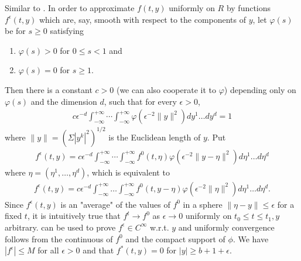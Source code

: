 \documentclass{article}
\begin{document}
Similar to \cite[P139 Lemma 4.1.1]{mtnotes}. In order to approximate $f(t, y)$ uniformly on $R$ by functions $f^{\epsilon}(t, y)$ which are, say, smooth with respect to the components of $y$, let $\varphi(s)$ be  for $s \ge 0$ satisfying
\begin{enumerate}
    \item  $\varphi(s)>0$ for $0 \le s<1$ and
    \item $\varphi(s)=0$ for $s \ge 1$.
\end{enumerate}Then there is a constant $c>0$ (we can also cooperate it to $\varphi$) depending only on $\varphi(s)$ and the dimension $d$, such that for every $\epsilon>0$,
\begin{align}
c \epsilon^{-d} \int_{-\infty}^{+\infty} \cdots \int_{-\infty}^{+\infty} \varphi\left(\epsilon^{-2}\|y\|^{2}\right) d y^{1} \ldots d y^{d}=1\label{eq:3.1I}
\end{align}
where $\|y\|=\left(\Sigma\left|y^{k}\right|^{2}\right)^{1 / 2}$ is the Euclidean length of $y$. Put
\begin{align}
    f^{\epsilon}(t, y)=c \epsilon^{-d} \int_{-\infty}^{+\infty} \cdots \int_{-\infty}^{+\infty} f^{0}(t, \eta) \varphi\left(\epsilon^{-2}\|y-\eta\|^{2}\right) d \eta^{1} \ldots d \eta^{d}\label{eq:3.2I}
\end{align}
where $\eta=\left(\eta^{1}, \ldots, \eta^{d}\right)$, which is equivalent to 
\begin{align}
    f^{\epsilon}(t, y)=c \epsilon^{-d} \int_{-\infty}^{+\infty} \ldots \int_{-\infty}^{+\infty} f^{0}(t, y-\eta) \varphi\left(\epsilon^{-2}\|\eta\|^{2}\right) d \eta^{1} \ldots d \eta^{d}.\label{eq:3.3I}
\end{align}
Since $f^{\epsilon}(t, y)$ is an "average" of the values of $f^{0}$ in a sphere $\|\eta-y\| \le \epsilon$ for a fixed $t$, it is intuitively true that $f^{t} \rightarrow f^{0}$ as $\epsilon \rightarrow 0$ uniformly on $t_{0} \le t \le t_{1}, y$ arbitrary.   can be used to prove $f^\epsilon\in C^\infty$ w.r.t. $y$ and uniformly convergence follows from the continuous of $f^0$ and the compact support of $\phi$. We have $\left|f^{\epsilon}\right| \le M$ for all $\epsilon>0$ and that $f^{*}(t, y)=0$ for $|y| \geq b+1+\epsilon$.
\end{document}
